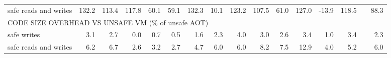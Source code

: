 \begin{tabular}{lrrrrrrrrrrrrrrr}
safe reads and writes               &      132.2 &      113.4 &      117.8 &       60.1 &       59.1 &      132.3 &       10.1 &      123.2 &      107.5 &       61.0 &      127.0 &      -13.9 &      118.5 &                   &      88.3 \\
\multicolumn{10}{l}{CODE SIZE OVERHEAD VS UNSAFE VM (\% of unsafe AOT)} \\
safe writes                         &        3.1 &        2.7 &        0.0 &        0.7 &        0.5 &        1.6 &        2.3 &        4.0 &        3.0 &        2.6 &        3.4 &        1.0 &        3.4 &                   &       2.3 \\
safe reads and writes               &        6.2 &        6.7 &        2.6 &        3.2 &        2.7 &        4.7 &        6.0 &        6.0 &        8.2 &        7.5 &       12.9 &        4.0 &        5.2 &                   &       6.0 \\
\bottomrule
\end{tabular}  
